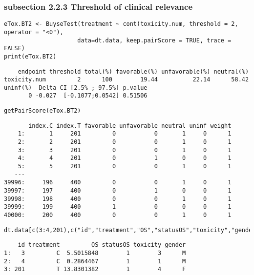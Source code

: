 \documentclass[12pt]{article}
\begin{document}
\subsubsection{subsection 2.2.3 Threshold of clinical relevance}
\label{sec:org242813c}

\lstset{language=r,label= ,caption= ,captionpos=b,numbers=none}
\begin{lstlisting}
eTox.BT2 <- BuyseTest(treatment ~ cont(toxicity.num, threshold = 2, operator = "<0"),
                     data=dt.data, keep.pairScore = TRUE, trace = FALSE)
print(eTox.BT2)
\end{lstlisting}

\begin{verbatim}
    endpoint threshold total(%) favorable(%) unfavorable(%) neutral(%)
toxicity.num         2      100        19.44          22.14      58.42
uninf(%)  Delta CI [2.5% ; 97.5%] p.value
       0 -0.027  [-0.1077;0.0542] 0.51506
\end{verbatim}



\lstset{language=r,label= ,caption= ,captionpos=b,numbers=none}
\begin{lstlisting}
getPairScore(eTox.BT2)
\end{lstlisting}

\begin{verbatim}
       index.C index.T favorable unfavorable neutral uninf weight
    1:       1     201         0           0       1     0      1
    2:       2     201         0           0       1     0      1
    3:       3     201         0           0       1     0      1
    4:       4     201         0           1       0     0      1
    5:       5     201         0           0       1     0      1
   ---                                                           
39996:     196     400         0           0       1     0      1
39997:     197     400         0           1       0     0      1
39998:     198     400         0           0       1     0      1
39999:     199     400         1           0       0     0      1
40000:     200     400         0           0       1     0      1
\end{verbatim}

\lstset{language=r,label= ,caption= ,captionpos=b,numbers=none}
\begin{lstlisting}
dt.data[c(3:4,201),c("id","treatment","OS","statusOS","toxicity","gender")]
\end{lstlisting}

\begin{verbatim}
    id treatment         OS statusOS toxicity gender
1:   3         C  5.5015848        1        3      M
2:   4         C  0.2864467        1        1      M
3: 201         T 13.8301382        1        4      F
\end{verbatim}
\end{document}
